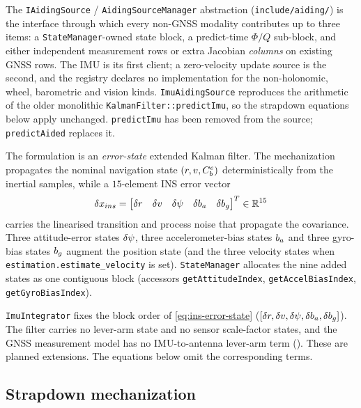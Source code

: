 \documentclass[main.tex]{subfiles}
\begin{document}
The \texttt{IAidingSource} / \texttt{AidingSourceManager} abstraction
(\texttt{include/aiding/}) is the interface through which every non-GNSS
modality contributes up to
three items: a \texttt{StateManager}-owned state block, a predict-time
$\Phi/Q$ sub-block, and either independent measurement rows or extra
Jacobian \emph{columns} on existing GNSS rows.  The IMU is its first
client; a zero-velocity update source is the second, and the registry
declares no implementation for the non-holonomic, wheel, barometric and
vision kinds.  \texttt{ImuAidingSource} reproduces the arithmetic of the
older monolithic \texttt{KalmanFilter::predictImu}, so the
strapdown equations below apply unchanged.  \texttt{predictImu} has been
removed from the source; \texttt{predictAided} replaces it.

The formulation is an \emph{error-state} extended Kalman filter.  The
mechanization propagates the nominal navigation state
$(r,v,C_b^e)$ deterministically from the inertial samples,
while a $15$-element INS error vector
\begin{equation}
\delta x_{ins}
  = \begin{bmatrix}\delta r & \delta v & \delta\psi
    & \delta b_a & \delta b_g\end{bmatrix}^{T}
  \in \mathbb{R}^{15}
\label{eq:ins-error-state}
\end{equation}
carries the linearised transition and process noise that propagate the
covariance.  Three attitude-error states $\delta\psi$, three
accelerometer-bias states $b_a$ and three gyro-bias states $b_g$
augment the position state (and the three velocity states when
\texttt{estimation.estimate\_velocity} is set).  \texttt{StateManager}
allocates the nine added states as one contiguous block (accessors
\texttt{getAttitudeIndex}, \texttt{getAccelBiasIndex},
\texttt{getGyroBiasIndex}).

\begin{remark}
\texttt{ImuIntegrator} fixes the block order of
\cref{eq:ins-error-state}
($[\delta r,\delta v,\delta\psi,\delta b_a,\delta b_g]$).  The
filter carries no lever-arm state and no sensor scale-factor states, and
the GNSS measurement model has no IMU-to-antenna lever-arm term
().  These are planned extensions.  The equations
below omit the corresponding terms.
\end{remark}

\subsection{Strapdown mechanization}\label{sec:imu-mech}
\end{document}
